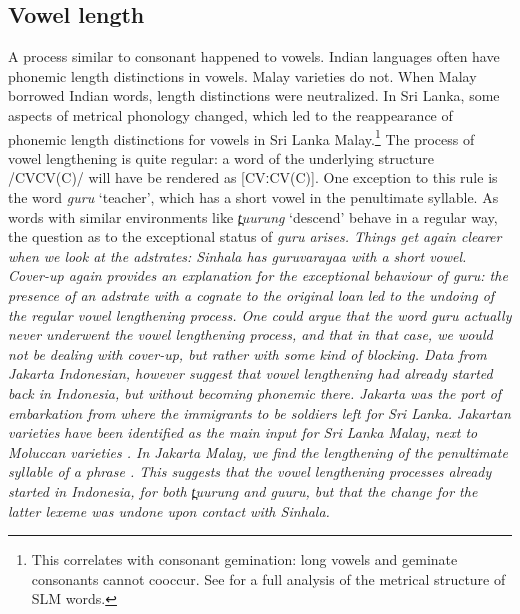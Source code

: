 \documentclass[a4paper,10pt]{article}
\newcommand{\trs}[2]{\textit{#1} `#2'}
\newcommand{\dentt}{t̪}
\begin{document}
\subsection{Vowel length} 
A process similar to consonant happened to vowels. Indian languages often have phonemic length distinctions in vowels. Malay varieties do not. When Malay borrowed Indian words, length distinctions were neutralized. In Sri Lanka, some aspects of metrical phonology changed, which led to the reappearance of phonemic length distinctions for vowels in Sri Lanka Malay.\footnote{This
 correlates with consonant gemination: long vowels and geminate consonants cannot cooccur. See \citet{Nordhoff2009phd} for a full analysis of the metrical structure of SLM words.
}
The process of vowel lengthening is quite regular: a word of the underlying structure /CVCV(C)/ will have be rendered as [CVːCV(C)]. One exception to this rule is the word \trs{guru}{teacher}, which has a short vowel in the penultimate syllable. As words with similar environments like \trs{{\dentt}uurung}{descend} behave in a regular way, the question as to the exceptional status of \em guru \em arises. Things get again clearer when we look at the adstrates: Sinhala has \em guruvarayaa \em  with a short vowel. Cover-up again provides an explanation for the exceptional behaviour of \em guru\em: the presence of an adstrate with a cognate to the original loan led to the undoing of the regular vowel lengthening process. One could argue that the word \em guru \em actually never underwent the vowel lengthening process, and that in that case, we would not be dealing with cover-up, but rather with some kind of blocking. Data from Jakarta Indonesian, however suggest that vowel lengthening had already started back in Indonesia, but
without becoming phonemic there. Jakarta was the port of embarkation from where the immigrants to be soldiers left for Sri Lanka. Jakartan varieties have been identified as the main input for Sri Lanka Malay, next to Moluccan varieties \citep{Paauw}. In Jakarta Malay, we find the lengthening of the penultimate syllable of a phrase \citep{abc}. This suggests that the vowel lengthening processes already started in Indonesia, for both \em {\dentt}uurung \em and \em guuru\em, but that the change for the latter lexeme was undone upon contact with Sinhala. 
\end{document}
